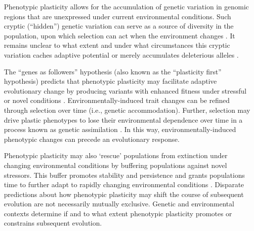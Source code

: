 Phenotypic plasticity allows for the accumulation of genetic variation in genomic regions that are unexpressed under current environmental conditions.
Such cryptic (``hidden'') genetic variation can serve as a source of diversity in the population, upon which selection can act when the environment changes \citep{schlichting_hidden_2008,levis_evaluating_2016}.  
It remains unclear to what extent and under what circumstances this cryptic variation caches adaptive potential or merely accumulates deleterious alleles \citep{gibson_uncovering_2004,paaby_cryptic_2014,zheng_cryptic_2019}.

The ``genes as followers'' hypothesis (also known as the ``plasticity first'' hypothesis) predicts that phenotypic plasticity may facilitate adaptive evolutionary change by producing variants with enhanced fitness under stressful or novel conditions \citep{west-eberhard_developmental_2003,schwander_genes_2011,levis_evaluating_2016}. 
Environmentally-induced trait changes can be refined through selection over time (i.e., genetic accommodation).
Further, selection may drive plastic phenotypes to lose their environmental dependence over time in a process known as genetic assimilation \citep{west-eberhard_developmental_2005,pigliucci_phenotypic_2006,crispo_baldwin_2007,schlichting_phenotypic_2014,levis_evaluating_2016}. 
In this way, environmentally-induced phenotypic changes can precede an evolutionary response.


Phenotypic plasticity may also `rescue' populations from extinction under changing environmental conditions by buffering populations against novel stressors.
This buffer promotes stability and persistence and grants populations time to further adapt to rapidly changing environmental conditions \citep{west-eberhard_developmental_2003,chevin_when_2010}. %
Disparate predictions about how phenotypic plasticity may shift the course of subsequent evolution are not necessarily mutually exclusive.
Genetic and environmental contexts determine if and to what extent phenotypic plasticity promotes or constrains subsequent evolution.

